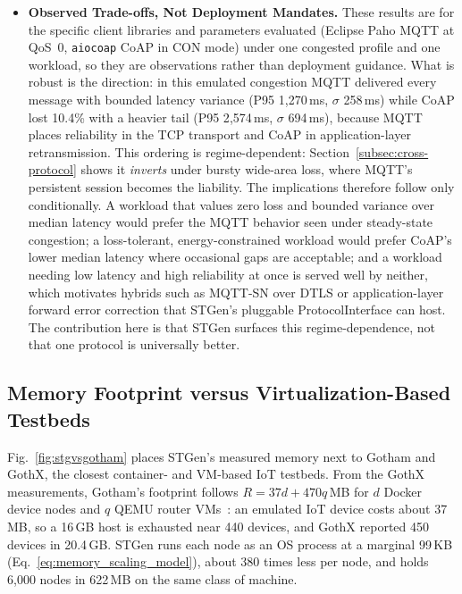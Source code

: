 \documentclass[jsan,article,submit,moreauthors,pdftex]{Definitions/mdpi}
\begin{document}
\begin{itemize}
    \item \textbf{Observed Trade-offs, Not Deployment Mandates.}
    These results are for the specific client libraries and parameters evaluated (Eclipse Paho MQTT at QoS~0, \texttt{aiocoap} CoAP in CON mode) under one congested profile and one workload, so they are observations rather than deployment guidance. What is robust is the direction: in this emulated congestion MQTT delivered every message with bounded latency variance (P95 1{,}270\,ms, $\sigma$ 258\,ms) while CoAP lost 10.4\% with a heavier tail (P95 2{,}574\,ms, $\sigma$ 694\,ms), because MQTT places reliability in the TCP transport and CoAP in application-layer retransmission. This ordering is regime-dependent: Section~\ref{subsec:cross-protocol} shows it \emph{inverts} under bursty wide-area loss, where MQTT's persistent session becomes the liability. The implications therefore follow only conditionally. A workload that values zero loss and bounded variance over median latency would prefer the MQTT behavior seen under steady-state congestion; a loss-tolerant, energy-constrained workload would prefer CoAP's lower median latency where occasional gaps are acceptable; and a workload needing low latency and high reliability at once is served well by neither, which motivates hybrids such as MQTT-SN over DTLS or application-layer forward error correction that STGen's pluggable ProtocolInterface can host. The contribution here is that STGen surfaces this regime-dependence, not that one protocol is universally better.
\end{itemize}


 



\subsection{Memory Footprint versus Virtualization-Based Testbeds}
\label{sub:memory-comparison}
Fig.~\ref{fig:stgvsgotham} places STGen's measured memory next to Gotham and GothX, the closest container- and VM-based IoT testbeds. From the GothX measurements, Gotham's footprint follows $R = 37d + 470q$\,MB for $d$ Docker device nodes and $q$ QEMU router VMs~\cite{poisson2024gothx}: an emulated IoT device costs about 37\,MB, so a 16\,GB host is exhausted near 440 devices, and GothX reported 450 devices in 20.4\,GB. STGen runs each node as an OS process at a marginal 99\,KB (Eq.~\ref{eq:memory_scaling_model}), about 380 times less per node, and holds 6{,}000 nodes in 622\,MB on the same class of machine.
\end{document}
